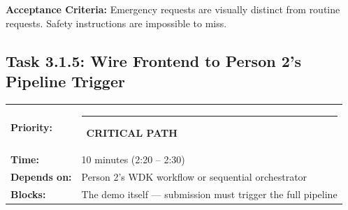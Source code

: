 \documentclass[11pt, a4paper]{article}
\newcommand{\critical}{\textcolor{critred}{\rule{6pt}{6pt}}~\textcolor{critred}{\scriptsize\textbf{CRITICAL PATH}}}
\begin{document}
\textbf{Acceptance Criteria:} Emergency requests are visually distinct from routine requests. Safety instructions are impossible to miss.

\vspace{1em}

\subsection{Task 3.1.5: Wire Frontend to Person 2's Pipeline Trigger}

\begin{tabularx}{\textwidth}{lX}
\textbf{Priority:} & \critical \\
\textbf{Time:} & 10 minutes (2:20 -- 2:30) \\
\textbf{Depends on:} & Person 2's WDK workflow or sequential orchestrator \\
\textbf{Blocks:} & The demo itself --- submission must trigger the full pipeline \\
\end{tabularx}

\vspace{0.3em}
\end{document}
